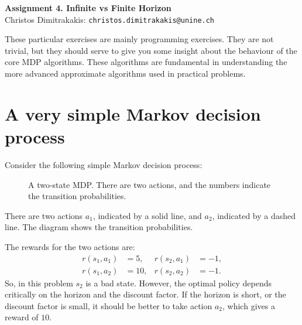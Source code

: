 \documentclass[twoside,a4paper]{article}
\begin{document}
\Large{\bf Assignment 4. Infinite vs Finite Horizon}
\vspace{1em}
\\
\large{Christos Dimitrakakis:} \texttt{christos.dimitrakakis@unine.ch}

These particular exercises are mainly programming exercises. They are not trivial, but they should serve to give you some insight about the behaviour of the core MDP algorithms. These algorithms are fundamental in understanding the more advanced approximate algorithms used in practical problems.

\section{A very simple Markov decision process}
Consider the following simple Markov decision process:
\begin{figure}[h]
  \centering
  \caption{A two-state MDP. There are two actions, and the numbers indicate the transition probabilities.}
  \label{fig:two-state-mdp}
\end{figure}
There are two actions $a_1$, indicated by a solid line, and $a_2$, indicated by a dashed line. The diagram shows the transition probabilities. 

The rewards for the two actions are:
\begin{align}
  \label{eq:1}
  r(s_1, a_1) &= 5, & r(s_2, a_1) &= -1,
  \\
  r(s_1, a_2) &= 10, & r(s_2, a_2) &= -1.
\end{align}
So, in this problem $s_2$ is a bad state. However, the optimal policy depends critically on the horizon and the discount factor. If the horizon is short, or the discount factor is small, it should be better to take action $a_2$, which gives a reward of $10$.
\end{document}
